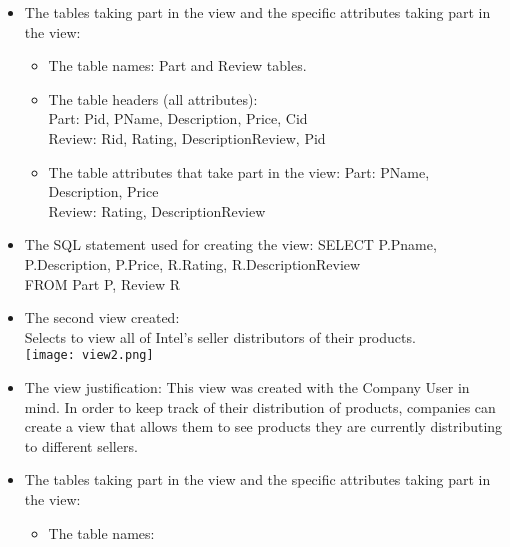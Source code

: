 {\begin{itemize}
\begin{itemize}
	\item{The tables taking part in the view and the specific attributes taking part in the view: }
	\begin{itemize} 
		\item{The table names: }
		Part and Review tables.
		\item{The table headers (all attributes): }\\
		Part: Pid, PName, Description, Price, Cid\\
		Review: Rid, Rating, DescriptionReview, Pid
		\item{The table attributes that take part in the view: }
		Part: PName, Description, Price\\
		Review: Rating, DescriptionReview
	\end{itemize}
	\item{The SQL statement used for creating the view: }
	SELECT P.Pname, P.Description, P.Price, R.Rating, R.DescriptionReview\\
	FROM Part P, Review R\\
\end{itemize}
\begin{itemize} 
	\item{The second view created: }\\
	Selects to view all of Intel's seller distributors of their products.\\
	\texttt{[image: view2.png]}
	\item{The view justification: }
	This view was created with the Company User in mind. In order to keep track of their distribution of products, companies can create a view that allows them to see products they are currently distributing to different sellers.
	\item{The tables taking part in the view and the specific attributes taking part in the view: }
	\begin{itemize} 
		\item{The table names: }

\end{itemize}
\end{itemize}
\end{itemize}}
